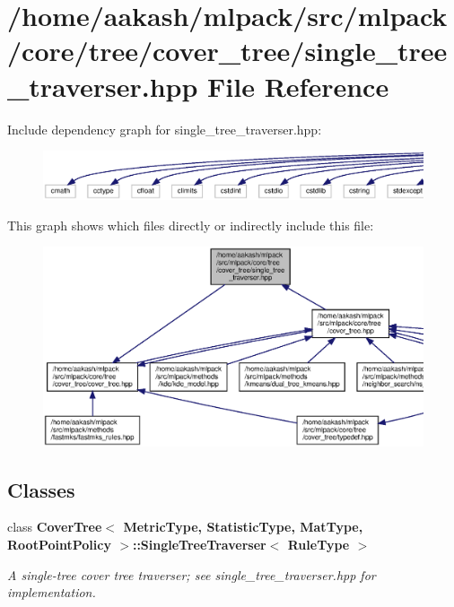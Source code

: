 \section{/home/aakash/mlpack/src/mlpack/core/tree/cover\+\_\+tree/single\+\_\+tree\+\_\+traverser.hpp File Reference}
\label{cover__tree_2single__tree__traverser_8hpp}
Include dependency graph for single\+\_\+tree\+\_\+traverser.\+hpp\+:
\nopagebreak
\begin{figure}[H]
\begin{center}
\leavevmode
\includegraphics[width=350pt]{cover__tree_2single__tree__traverser_8hpp__incl}
\end{center}
\end{figure}
This graph shows which files directly or indirectly include this file\+:
\nopagebreak
\begin{figure}[H]
\begin{center}
\leavevmode
\includegraphics[width=350pt]{cover__tree_2single__tree__traverser_8hpp__dep__incl}
\end{center}
\end{figure}
\subsection*{Classes}
\begin{DoxyCompactItemize}
\item 
class \textbf{ Cover\+Tree$<$ Metric\+Type, Statistic\+Type, Mat\+Type, Root\+Point\+Policy $>$\+::\+Single\+Tree\+Traverser$<$ Rule\+Type $>$}
\begin{DoxyCompactList}\small\item\em A single-\/tree cover tree traverser; see single\+\_\+tree\+\_\+traverser.\+hpp for implementation. \end{DoxyCompactList}\end{DoxyCompactItemize}
